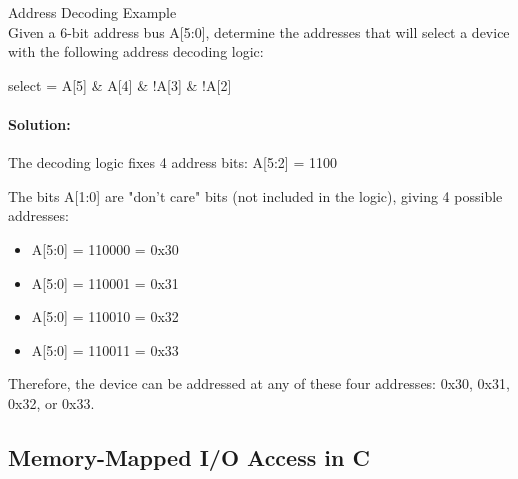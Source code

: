 \begin{example2}{Address Decoding Example}\\
Given a 6-bit address bus A[5:0], determine the addresses that will select a device with the following address decoding logic:
\begin{center}
select = A[5] \& A[4] \& !A[3] \& !A[2]
\end{center}

\tcblower
\paragraph{Solution:}
The decoding logic fixes 4 address bits: A[5:2] = 1100

The bits A[1:0] are "don't care" bits (not included in the logic), giving 4 possible addresses:
\begin{itemize}
    \item A[5:0] = 110000 = 0x30
    \item A[5:0] = 110001 = 0x31
    \item A[5:0] = 110010 = 0x32
    \item A[5:0] = 110011 = 0x33
\end{itemize}

Therefore, the device can be addressed at any of these four addresses: 0x30, 0x31, 0x32, or 0x33.
\end{example2}

\columnbreak

\subsection{Memory-Mapped I/O Access in C}

